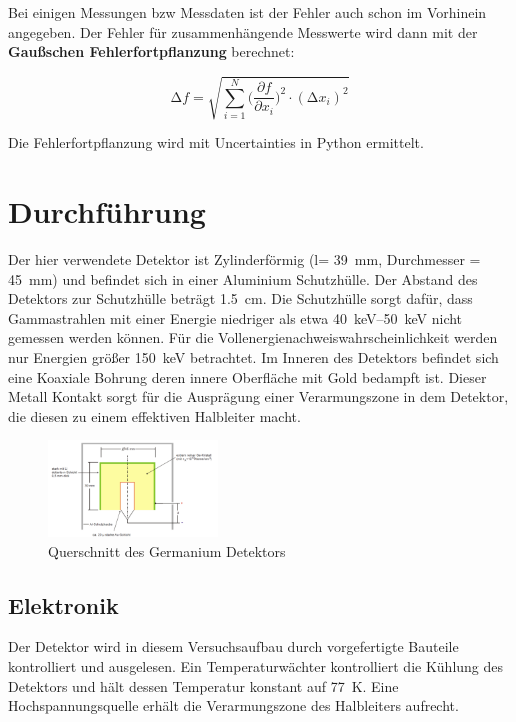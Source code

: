 Bei einigen Messungen bzw Messdaten ist der Fehler auch schon im Vorhinein
angegeben. Der Fehler für zusammenhängende Messwerte wird dann mit der
\textbf{Gaußschen Fehlerfortpflanzung} berechnet:

\begin{equation}
	\increment{f} = \sqrt{ \sum_{i = 1}^{N}  \biggl(\frac{\partial{f}}{\partial{x_i}}\biggr)^2\cdot(\increment{x_i})^2}
	\label{eqn:Gauss}
\end{equation}

Die Fehlerfortpflanzung wird mit Uncertainties in Python \cite{uncertainties}
ermittelt.


\section{Durchführung \cite[vgl.][]{man:v18}}

Der hier verwendete Detektor ist Zylinderförmig (l= \qty{39}{\mm}, Durchmesser
= \qty{45}{\mm}) und befindet sich in einer Aluminium Schutzhülle. Der Abstand
des Detektors zur Schutzhülle beträgt \qty{1.5}{\cm}. Die Schutzhülle sorgt
dafür, dass Gammastrahlen mit einer Energie niedriger als etwa
\qtyrange{40}{50}{\keV} nicht gemessen werden können. Für die
Vollenergienachweiswahrscheinlichkeit werden nur Energien größer
\qty{150}{\keV} betrachtet. Im Inneren des Detektors befindet sich eine
Koaxiale Bohrung deren innere Oberfläche mit Gold bedampft ist. Dieser Metall
Kontakt sorgt für die Ausprägung einer Verarmungszone in dem Detektor, die
diesen zu einem effektiven Halbleiter macht.

\begin{figure}
	\centering
	\includegraphics[width=0.4\textwidth]{./Bilder/querschnitt_detektor.png}
	\caption{Querschnitt des Germanium Detektors}\label{fig:cross}
\end{figure}


\subsection{Elektronik \cite[][Kap.17]{book:kolano}}
Der Detektor wird in diesem Versuchsaufbau durch vorgefertigte Bauteile
kontrolliert und ausgelesen. Ein Temperaturwächter kontrolliert die Kühlung des
Detektors und hält dessen Temperatur konstant auf \qty{77}{\kelvin}. Eine
Hochspannungsquelle erhält die Verarmungszone des Halbleiters aufrecht.

